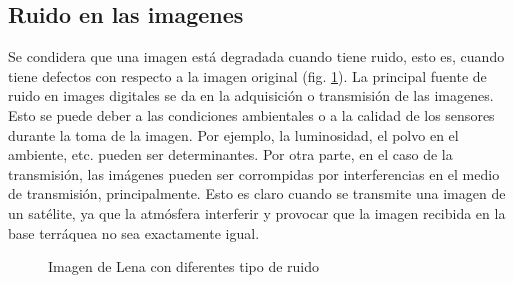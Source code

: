 \subsection{Ruido en las imagenes}\label{sec:ruido}
Se condidera que una imagen está degradada cuando tiene ruido, esto es, cuando tiene defectos con respecto a la imagen original (fig. \ref{fig:defruido}). La principal fuente de ruido en images digitales se da en la adquisición o transmisión de las imagenes. Esto se puede deber a las condiciones ambientales o a la calidad de los sensores durante la toma de la imagen. Por ejemplo, la luminosidad, el polvo en el ambiente, etc. pueden ser determinantes. Por otra parte, en el caso de la transmisión, las imágenes pueden ser corrompidas por interferencias en el medio de transmisión, principalmente. Esto es claro cuando se transmite una imagen de un satélite, ya que la atmósfera interferir y provocar que la imagen recibida en la base terráquea no sea exactamente igual.
\begin{figure}
\centering
    \quad
    \quad
    \caption{Imagen de Lena con diferentes tipo de ruido}
    \label{fig:defruido}
\end{figure}

